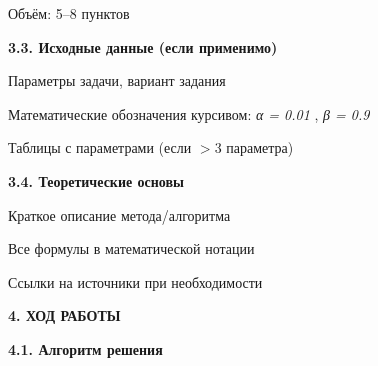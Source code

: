 \documentclass{article}%
\begin{document}
\begin{flushleft}%
Объём: 5–8 пунктов%
%
\end{flushleft}%
\begin{flushleft}%
\textbf{3.3. Исходные данные (если применимо)}%
%
\end{flushleft}%
\begin{flushleft}%
Параметры задачи, вариант задания%
%
\end{flushleft}%
\begin{flushleft}%
Математические обозначения курсивом: %
\textit{α = 0.01}%
, %
\textit{β = 0.9}%
%
\end{flushleft}%
\begin{flushleft}%
Таблицы с параметрами (если $>$3 параметра)%
%
\end{flushleft}%
\begin{flushleft}%
\textbf{3.4. Теоретические основы}%
%
\end{flushleft}%
\begin{flushleft}%
Краткое описание метода/алгоритма%
%
\end{flushleft}%
\begin{flushleft}%
Все формулы в математической нотации%
%
\end{flushleft}%
\begin{flushleft}%
Ссылки на источники при необходимости%
%
\end{flushleft}%
\begin{flushleft}%
\textbf{4. ХОД РАБОТЫ}%
%
\end{flushleft}%
\begin{flushleft}%
\textbf{4.1. Алгоритм решения}%
%
\end{flushleft}%
\end{document}
